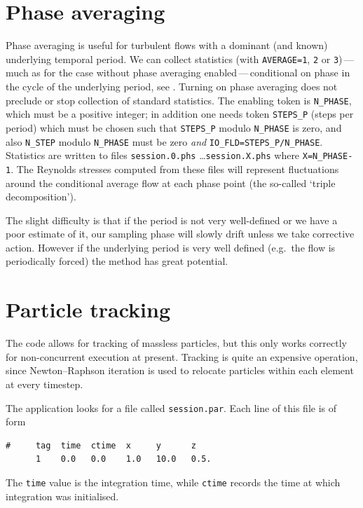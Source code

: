 \documentclass[11pt]{report}
\newcommand{\eg}{e.g.\ } \newcommand{\CC}{\mathrm{c.c.}}
\begin{document}
\section{Phase averaging}
\label{sec.phase}

Phase averaging is useful for turbulent flows with a dominant (and
known) underlying temporal period.  We can collect statistics (with
\verb|AVERAGE=1|, \verb|2| or \verb|3|)\,---\,much as for the case
without phase averaging enabled\,---\,conditional on phase in the
cycle of the underlying period, see \citet{rehu72}.  Turning
on phase averaging does not preclude or stop collection of standard
statistics.  The enabling token is \verb|N_PHASE|, which must be a
positive integer; in addition one needs token \verb|STEPS_P| (steps
per period) which must be chosen such that \verb|STEPS_P| modulo
\verb|N_PHASE| is zero, and also \verb|N_STEP| modulo \verb|N_PHASE|
must be zero \emph{and} \verb|IO_FLD=STEPS_P/N_PHASE|.  Statistics are
written to files \verb|session.0.phs| \ldots \verb|session.X.phs|
where \verb|X=N_PHASE-1|.  The Reynolds stresses computed from these
files will represent fluctuations around the conditional average flow
at each phase point (the so-called `triple decomposition').

The slight difficulty is that if the period is not very well-defined
or we have a poor estimate of it, our sampling phase will slowly drift
unless we take corrective action.  However if the underlying period is
very well defined (\eg the flow is periodically forced) the method has
great potential.

\section{Particle tracking}
\label{sec.particle}

The code allows for tracking of massless particles, but this only
works correctly for non-concurrent execution at present.  Tracking is
quite an expensive operation, since Newton--Raphson iteration is used
to relocate particles within each element at every timestep.

The application looks for a file called \verb+session.par+.  Each line
of this file is of form
\begin{verbatim}
#     tag  time  ctime  x     y      z
      1    0.0   0.0    1.0   10.0   0.5.
\end{verbatim}
The \verb+time+ value is the integration time, while \verb+ctime+
records the time at which integration was initialised.
\end{document}

